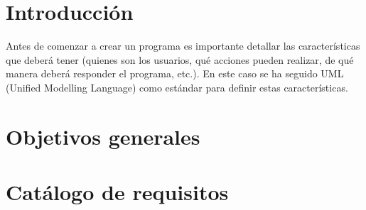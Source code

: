 \setcounter{ncu}{0}
\newcommand{\cu}[9]{
    \addtocounter{ncu}{1}

    \begin{table}[p]
        \centering
        \begin{tabularx}{\linewidth}{ p{0.21\columnwidth} p{0.71\columnwidth} }
            \toprule
            \textbf{CU-\arabic{ncu}}      & \textbf{#1} \\
            \toprule
            \textbf{Versión}              & #2          \\
            \textbf{Autor}                & \theauthor  \\
            \textbf{Requisitos asociados} & #3          \\
            \textbf{Descripción}          & #4          \\
            \textbf{Precondición}         & #5          \\
            \textbf{Acciones}             &
            #6                                          \\
            \textbf{Postcondición}        & #7          \\
            \textbf{Excepciones}          & #8          \\
            \textbf{Importancia}          & #9          \\
            \bottomrule
        \end{tabularx}
        \caption{CU-\arabic{ncu} #1.}
    \end{table}
}


\label{cha:Especificación de Requisitos}

\section{Introducción}

Antes de comenzar a crear un programa es importante detallar las características
que deberá tener (quienes son los usuarios, qué acciones pueden realizar, de qué
manera deberá responder el programa, etc.). En este caso se ha seguido UML
(Unified Modelling Language) como estándar para definir estas características.

\section{Objetivos generales}

\section{Catálogo de requisitos}

